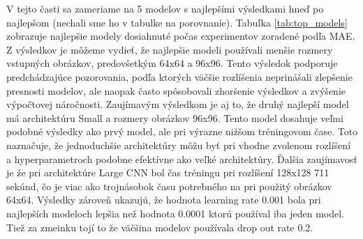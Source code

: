 V tejto časti sa zameriame na 5 modelov s najlepšími výsledkami hneď po najlepšom (nechali sme ho v tabulke na porovnanie). Tabuľka \ref{tab:top_models} zobrazuje najlepšie modely dosiahnuté počas experimentov zoradené podľa MAE.  
Z výsledkov je môžeme vydieť, že najlepšie modeli používali menšie rozmery vstupných obrázkov, predovšetkým 64x64 a 96x96. Tento výsledok podporuje predchádzajúce pozorovania, podľa ktorých  väčšie rozlíšenia neprinášali zlepšenie presnosti modelov, ale naopak často spôsobovali zhoršenie výsledkov a zvýšenie výpočtovej náročnosti.
Zaujímavým výsledkom je aj to, že druhý najlepší model má architektúru Small a rozmery obrázkov 96x96. Tento model dosahuje veľmi podobné výsledky ako prvý model, ale pri výrazne nižšom tréningovom čase. Toto naznačuje, že jednoduchšie architektúry môžu byť pri vhodne zvolenom rozlíšení a hyperparametroch podobne efektívne ako veľké architektúry. 
Ďalšia zaujímavosť je že pri architektúre Large CNN bol čas tréningu pri rozlíšení 128x128 711 sekúnd, čo je viac ako trojnásobok času potrebného na pri použitý obrázkov 64x64.
Výsledky zároveň ukazujú, že hodnota learning rate 0.001 bola pri najlepších modeloch lepšia než hodnota 0.0001 ktorú používal iba jeden model. Tiež za zmeinku tojí to že väčšina modelov používala drop out rate 0.2.  